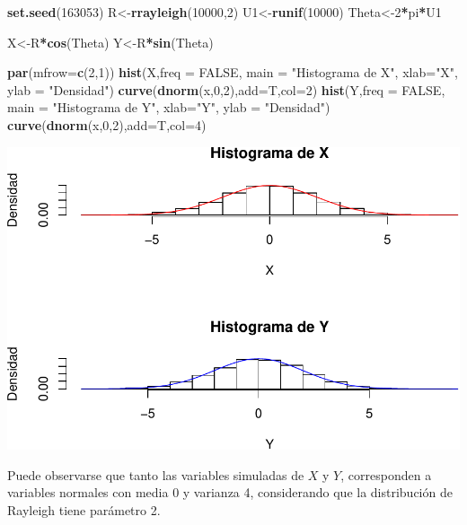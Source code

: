 \documentclass[]{article}
\newenvironment{Shaded}{\begin{snugshade}}{\end{snugshade}}
\newcommand{\KeywordTok}[1]{\textcolor[rgb]{0.13,0.29,0.53}{\textbf{#1}}}
\newcommand{\DataTypeTok}[1]{\textcolor[rgb]{0.13,0.29,0.53}{#1}}
\newcommand{\DecValTok}[1]{\textcolor[rgb]{0.00,0.00,0.81}{#1}}
\newcommand{\StringTok}[1]{\textcolor[rgb]{0.31,0.60,0.02}{#1}}
\newcommand{\OtherTok}[1]{\textcolor[rgb]{0.56,0.35,0.01}{#1}}
\newcommand{\OperatorTok}[1]{\textcolor[rgb]{0.81,0.36,0.00}{\textbf{#1}}}
\newcommand{\NormalTok}[1]{#1}
\begin{document}
\begin{Shaded}
\begin{Highlighting}[]
\KeywordTok{set.seed}\NormalTok{(}\DecValTok{163053}\NormalTok{)}
\NormalTok{R<-}\KeywordTok{rrayleigh}\NormalTok{(}\DecValTok{10000}\NormalTok{,}\DecValTok{2}\NormalTok{)}
\NormalTok{U1<-}\KeywordTok{runif}\NormalTok{(}\DecValTok{10000}\NormalTok{)}
\NormalTok{Theta<-}\DecValTok{2}\OperatorTok{*}\NormalTok{pi}\OperatorTok{*}\NormalTok{U1}

\NormalTok{X<-R}\OperatorTok{*}\KeywordTok{cos}\NormalTok{(Theta)}
\NormalTok{Y<-R}\OperatorTok{*}\KeywordTok{sin}\NormalTok{(Theta)}

\KeywordTok{par}\NormalTok{(}\DataTypeTok{mfrow=}\KeywordTok{c}\NormalTok{(}\DecValTok{2}\NormalTok{,}\DecValTok{1}\NormalTok{))}
\KeywordTok{hist}\NormalTok{(X,}\DataTypeTok{freq =} \OtherTok{FALSE}\NormalTok{, }\DataTypeTok{main =} \StringTok{"Histograma de X"}\NormalTok{, }\DataTypeTok{xlab=}\StringTok{"X"}\NormalTok{, }\DataTypeTok{ylab =} \StringTok{"Densidad"}\NormalTok{)}
\KeywordTok{curve}\NormalTok{(}\KeywordTok{dnorm}\NormalTok{(x,}\DecValTok{0}\NormalTok{,}\DecValTok{2}\NormalTok{),}\DataTypeTok{add=}\NormalTok{T,}\DataTypeTok{col=}\DecValTok{2}\NormalTok{)}
\KeywordTok{hist}\NormalTok{(Y,}\DataTypeTok{freq =} \OtherTok{FALSE}\NormalTok{, }\DataTypeTok{main =} \StringTok{"Histograma de Y"}\NormalTok{, }\DataTypeTok{xlab=}\StringTok{"Y"}\NormalTok{, }\DataTypeTok{ylab =} \StringTok{"Densidad"}\NormalTok{)}
\KeywordTok{curve}\NormalTok{(}\KeywordTok{dnorm}\NormalTok{(x,}\DecValTok{0}\NormalTok{,}\DecValTok{2}\NormalTok{),}\DataTypeTok{add=}\NormalTok{T,}\DataTypeTok{col=}\DecValTok{4}\NormalTok{)}
\end{Highlighting}
\end{Shaded}

\includegraphics{notebook_simulaciones_files/figure-latex/unnamed-chunk-12-1.pdf}

Puede observarse que tanto las variables simuladas de \(X\) y \(Y\),
corresponden a variables normales con media 0 y varianza 4, considerando
que la distribución de Rayleigh tiene parámetro 2.
\end{document}
